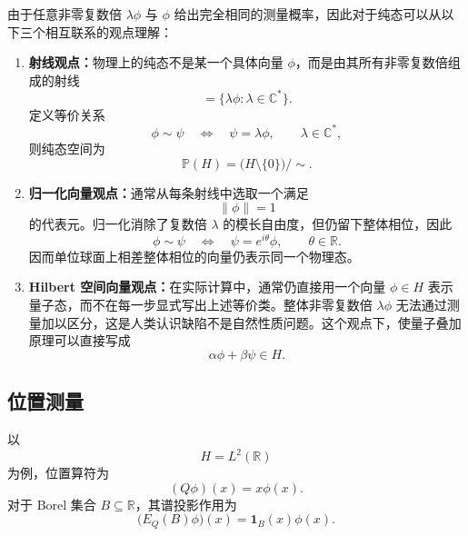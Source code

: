 \documentclass[UTF8,a4paper,11pt,openany]{ctexbook}
\begin{document}
\begin{proposition}[纯态的三种观点]
由于任意非零复数倍 $\lambda\phi$ 与 $\phi$ 给出完全相同的测量概率，因此对于纯态可以从以下三个相互联系的观点理解：

\begin{enumerate}
    \item \textbf{射线观点：}物理上的纯态不是某一个具体向量 $\phi$，而是由其所有非零复数倍组成的射线
    \begin{equation}
        [\phi]
        =
        \{\lambda\phi:\lambda\in\mathbb C^\ast\}.
    \end{equation}
    定义等价关系
    \[
        \phi\sim\psi
        \quad\Longleftrightarrow\quad
        \psi=\lambda\phi,
        \qquad \lambda\in\mathbb C^\ast,
    \]
    则纯态空间为
    \begin{equation}
        \mathbb P(H)
        =
        \bigl(H\setminus\{0\}\bigr)/\sim.
    \end{equation}

    \item \textbf{归一化向量观点：}通常从每条射线中选取一个满足
    \[
        \|\phi\|=1
    \]
    的代表元。归一化消除了复数倍 $\lambda$ 的模长自由度，但仍留下整体相位，因此
    \begin{equation}
        \phi\sim\psi
        \quad\Longleftrightarrow\quad
        \psi=e^{i\theta}\phi,
        \qquad \theta\in\mathbb R.
    \end{equation}
    因而单位球面上相差整体相位的向量仍表示同一个物理态。

    \item \textbf{Hilbert 空间向量观点：}在实际计算中，通常仍直接用一个向量
    $\phi\in H$ 表示量子态，而不在每一步显式写出上述等价类。整体非零复数倍
    $\lambda\phi$ 无法通过测量加以区分，这是人类认识缺陷不是自然性质问题。这个观点下，使量子叠加原理可以直接写成
    \begin{equation}
        \alpha\phi+\beta\psi\in H.
    \end{equation}
\end{enumerate}
\end{proposition}

\subsection{位置测量}

以
\[
H=L^2(\mathbb R)
\]
为例，位置算符为
\[
(Q\phi)(x)=x\phi(x).
\]
对于 Borel 集合 $B\subseteq\mathbb R$，其谱投影作用为
\begin{equation}
    \bigl(E_Q(B)\phi\bigr)(x)
    =
    \mathbf 1_B(x)\phi(x).
\end{equation}
\end{document}
